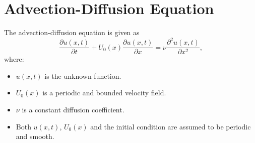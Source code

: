 \section{Advection-Diffusion Equation}\label{sec:advection_diffusion_equation}
The advection-diffusion equation is given as
\begin{equation}
	\frac{\partial u(x,t)}{\partial t} + U_0(x) \frac{\partial u(x,t)}{\partial x} = \nu \frac{\partial^2 u(x,t)}{\partial x^2},
	\label{eq:adv_diff_eq}
\end{equation}
where:
\begin{itemize}
	\item $u(x,t)$ is the unknown function.
	\item $U_0(x)$ is a periodic and bounded velocity field.
	\item $\nu$ is a constant diffusion coefficient.
	\item Both $u(x,t)$, $U_0(x)$ and the initial condition are assumed to be periodic and smooth.
\end{itemize}

